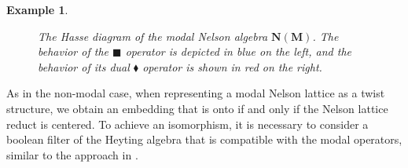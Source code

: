 \documentclass[pdflatex,sn-mathphys-num]{sn-jnl}%
\theoremstyle{thmstyleone}%
\theoremstyle{thmstyletwo}%
\newtheorem{example}{Example}%
\theoremstyle{thmstylethree}%
\begin{document}
\begin{example}
\begin{figure}[ht]
\caption{The Hasse diagram of the modal Nelson algebra $\mathbf{N}(\mathbf{M})$. The behavior of the $\blacksquare$ operator is depicted in blue on the left, and the behavior of its dual $\blacklozenge$ operator is shown in red on the right.}
\label{fig2*}
\end{figure}
\end{example}

As in the non-modal case, when representing a modal Nelson lattice as a twist structure, we obtain an embedding that is onto if and only if the Nelson lattice reduct is centered. To achieve an isomorphism, it is necessary to consider a boolean filter of the Heyting algebra that is compatible with the modal operators, similar to the approach in \cite{JanRivi2014}.
\end{document}
